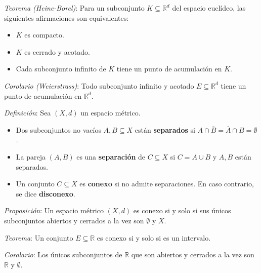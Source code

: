 \documentclass{beamer}
\begin{document}
  \begin{frame}
    \textit{Teorema (Heine-Borel)}: Para un subconjunto $K \subseteq \mathbb{R}^d$ del espacio euclídeo, las siguientes afirmaciones son equivalentes:
    \newline

    \begin{itemize}[<+->]
      \item $K$ es compacto.
      \item $K$ es cerrado y acotado.
      \item Cada subconjunto infinito de $K$ tiene un punto de acumulación en $K$.
    \end{itemize}

    \pause
    \vspace{0.5em}
    \textit{Corolario (Weierstrass)}: Todo subconjunto infinito y acotado $E \subseteq \mathbb{R}^d$ tiene un punto de acumulación en $\mathbb{R}^d$.
  \end{frame}

  \begin{frame}
    \textit{Definición}: Sea $(X, d)$ un espacio métrico.
    \newline

    \begin{itemize}[<+->]
      \item Dos subconjuntos no vacíos $A, B \subseteq X$ están \textbf{separados} si $A \cap \overline{B} = \overline{A} \cap B = \emptyset$.
      \item La pareja $(A, B)$ es una \textbf{separación} de $C \subseteq X$ si $C = A \cup B$ y $A, B$ están separados.
      \item Un conjunto $C \subseteq X$ es \textbf{conexo} si no admite separaciones. En caso contrario, se dice \textbf{disconexo}.
    \end{itemize}
  \end{frame}

  \begin{frame}
    \textit{Proposición}: Un espacio métrico $(X, d)$ es conexo si y solo si sus únicos subconjuntos abiertos y cerrados a la vez son $\emptyset$ y $X$.
    \newline\newline

    \pause
    \textit{Teorema}: Un conjunto $E \subseteq \mathbb{R}$ es conexo si y solo si es un intervalo.
    \newline\newline

    \pause
    \textit{Corolario}: Los únicos subconjuntos de $\mathbb{R}$ que son abiertos y cerrados a la vez son $\mathbb{R}$ y $\emptyset$.
  \end{frame}
\end{document}
